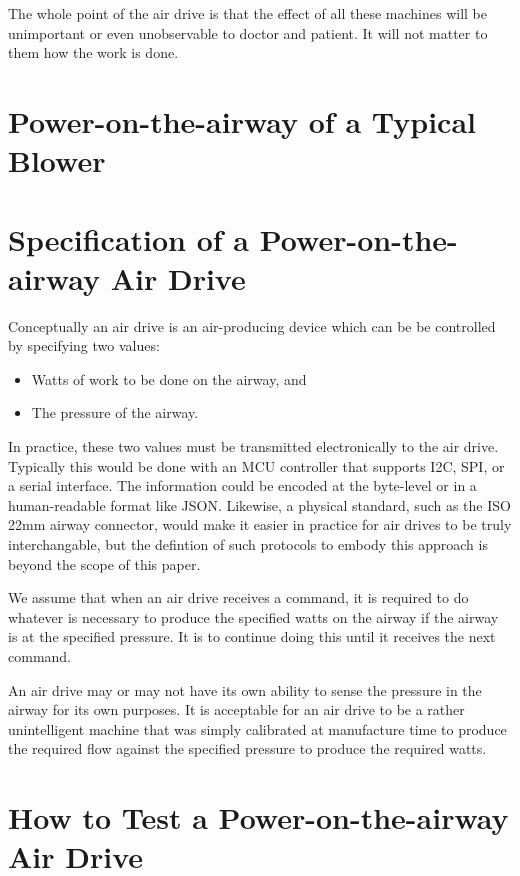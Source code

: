 \documentclass{article}
\begin{document}
The whole point of the air drive is that the effect of all these machines will be unimportant or even unobservable
to doctor and patient. It will not matter to them how the work is done.

\section{Power-on-the-airway of a Typical Blower}



\section{Specification of a Power-on-the-airway Air Drive}

Conceptually an air drive is an air-producing device which can be be controlled by specifying two values:
\begin{itemize}
 \item Watts of work to be done on the airway, and
 \item The pressure of the airway.
\end{itemize}

In practice, these two values must be transmitted electronically to the air drive.
Typically this would be done with an MCU controller that supports I2C, SPI, or a serial interface.
The information could be encoded at the byte-level or in a human-readable format like JSON.
Likewise, a physical standard, such as the ISO 22mm airway connector, would make it easier
in practice for air drives to be truly interchangable, but
the defintion of such protocols to embody this approach is beyond the scope of this paper.

We assume that when an air drive receives a command, it is required to
do whatever is necessary to produce the specified
watts on the airway if the airway is at the specified pressure.
It is to continue doing this until it receives the next command.

An air drive may or may not have its own ability to sense the pressure in the airway
for its own purposes. It is acceptable for an air drive to be a rather unintelligent
machine that was simply calibrated at manufacture time to produce the required
flow against the specified pressure to produce the required watts.

\section{How to Test a  Power-on-the-airway Air Drive}
\end{document}

